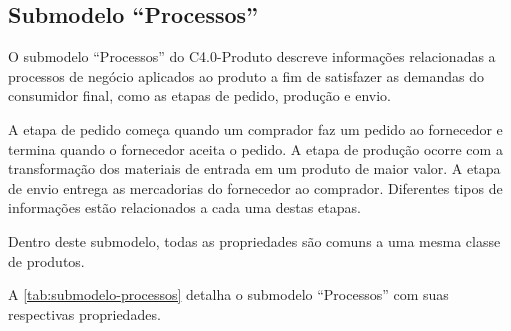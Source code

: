 \subsection{Submodelo ``Processos''}

O submodelo ``Processos'' do C4.0-Produto descreve informações relacionadas a processos de negócio aplicados ao produto a fim de satisfazer as demandas do consumidor final, como as etapas de pedido, produção e envio.

A etapa de pedido começa quando um comprador faz um pedido ao fornecedor e termina quando o fornecedor aceita o pedido. A etapa de produção ocorre com a transformação dos materiais de entrada em um produto de maior valor. A etapa de envio entrega as mercadorias do fornecedor ao comprador. Diferentes tipos de informações estão relacionados a cada uma destas etapas.

Dentro deste submodelo, todas as propriedades são comuns a uma mesma classe de produtos.

A \autoref{tab:submodelo-processos} detalha o submodelo ``Processos'' com suas respectivas propriedades.

